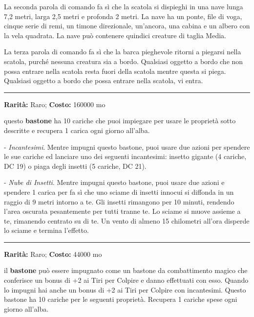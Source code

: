 \begin{multicols}{2}
La seconda parola di comando fa sì che la scatola si dispieghi in una nave lunga 7,2 metri, larga 2,5 metri e profonda 2 metri. La nave ha un ponte, file di voga, cinque serie di remi, un timone direzionale, un'ancora, una cabina e un albero con la vela quadrata. La nave può contenere quindici creature di taglia Media.

La terza parola di comando fa sì che la barca pieghevole ritorni a piegarsi nella scatola, purché nessuna creatura sia a bordo. Qualsiasi oggetto a bordo che non possa entrare nella scatola resta fuori della scatola mentre questa si piega. Qualsiasi oggetto a bordo che possa entrare nella scatola, vi entra.

\smallskip\noindent\rule{\linewidth}{2pt}  \hypertarget{BastonedegliInsettiSciamanti}{}\medskip{}\noindent\label{BastonedegliInsettiSciamanti}

\textbf{Rarità:} Raro; \textbf{Costo:} 160000 mo

questo \textbf{bastone} ha 10 cariche che puoi impiegare per usare le proprietà sotto descritte e recupera 1 carica ogni giorno all'alba.

- \emph{Incantesimi}. Mentre impugni questo bastone, puoi usare due azioni per spendere le sue cariche ed lanciare uno dei seguenti incantesimi: insetto gigante (4 cariche, DC 19) o piaga degli insetti (5 cariche, DC 21).

- \emph{Nube di Insetti}. Mentre impugni questo bastone, puoi usare due azioni e spendere 1 carica per fa sì che uno sciame di insetti innocui si diffonda in un raggio di 9 metri intorno a te. Gli insetti rimangono per 10 minuti, rendendo l'area oscurata pesantemente per tutti tranne te. Lo sciame si muove assieme a te, rimanendo centrato su di te. Un vento di almeno 15 chilometri all'ora disperde lo sciame e termina l'effetto.

\smallskip\noindent\rule{\linewidth}{2pt}  \hypertarget{BastonedeiBoschi}{}\medskip{}\noindent\label{BastonedeiBoschi}

\textbf{Rarità:} Raro; \textbf{Costo:} 44000 mo

il \textbf{bastone} può essere impugnato come un bastone da combattimento magico che conferisce un bonus di +2 ai Tiri per Colpire e danno effettuati con esso. Quando lo impugni hai anche un bonus di +2 ai Tiri per Colpire con incantesimi.
Questo bastone ha 10 cariche per le seguenti proprietà. Recupera 1 cariche spese ogni giorno all'alba.


\end{multicols}
